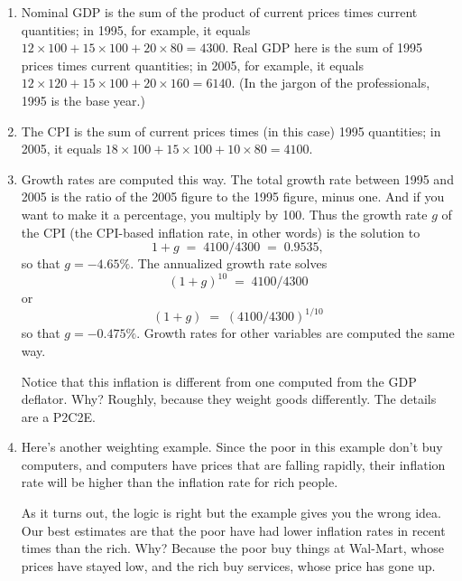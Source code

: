 \documentclass[letterpaper,12pt]{article}
\begin{document}
\begin{enumerate}
\begin{enumerate} 
\item 
Nominal GDP is the sum of the
product of current prices times current quantities; 
in 1995, for example, it equals 
$12\times 100+ 15 \times 100 + 20\times 80 = 4300 $. 
Real GDP here is the sum of 1995 prices times
current quantities; in 2005, for example, 
it equals 
$12\times 120 + 15 \times 100 + 20\times 160 = 6140$.  
(In the jargon of the professionals, 1995 is the base year.) 


\item The CPI is the sum of
current prices times (in this case) 1995 quantities; 
in 2005, it equals 
$18\times 100+ 15\times 100 + 10\times 80 = 4100$.


\item Growth rates are computed this way.  The total growth rate
between 1995 and 2005 is the ratio of the 2005 figure to the 1995
figure, minus one.  And if you want to make it a percentage, 
you multiply by 100.
Thus the growth rate $g$ of the CPI (the CPI-based inflation rate, in other words) is the solution to
\[
    1 + g \;=\; 4100/4300 \;=\; 0.9535 ,
\]
so that $g = - 4.65\%$.  
The annualized growth rate solves
\[
    (1 + g)^{10} \;=\; 4100/4300
\]
or
\[
    (1 + g) \;=\; (4100/4300)^{1/10}
\]
so that $g = -0.475\%$.  Growth rates for other variables are
computed the same way.

Notice that this inflation is different from one computed
from the GDP deflator.
Why?  Roughly, because they weight goods differently.  
The details are a P2C2E. 

\item Here's another weighting example.  
Since the poor in this example don't buy computers, 
and computers have prices that are falling rapidly, 
their inflation rate will be higher than the inflation 
rate for rich people.  

As it turns out, the logic is right but the example
gives you the wrong idea.  Our best estimates are that the poor 
have had lower inflation rates in recent times than the rich.
Why?  Because the poor buy things at Wal-Mart, 
whose prices have stayed low, 
and the rich buy services, whose price has gone up.  

\end{enumerate} 


\end{enumerate}
\end{document}
